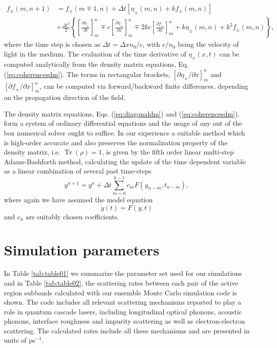 \documentclass[10pt,letterpaper]{article}%
\DeclareMathOperator{\Tr}{Tr}
\begin{document}
\begin{appendices}
\begin{align}
f_{\pm}(m,n+1) &  =f_{\pm}(m\mp1,n)+\Delta t\left[  \eta_{\pm}(m,n)+kf_{\pm
}(m,n)\right]  \nonumber\label{eq:riskennummedal}\\
&  +\frac{\Delta t^{2}}{2}\left\{  \left[  \frac{\partial \eta_{\pm}}{\partial
t}\right]  _{m}^{n}\mp c\left[  \frac{\partial \eta_{\pm}}{\partial x}\right]
_{m}^{n}\mp2kc\left[  \frac{\partial f_{\pm}}{\partial x}\right]  _{m}%
^{n}+k\eta_{\pm}(m,n)+k^{2}f_{\pm}(m,n)\right\}  ,
\end{align}
where the time step is chosen as $\Delta t=\Delta xn_{0}/c$, with $c/n_{0}$
being the velocity of light in the medium. The evaluation of the time
derivative of $\eta_{\pm}(x,t)$ can be computed analytically from the density matrix
equations, Eq. (\ref{eq:coherencesdm}). The terms in rectangular brackets, $\left[
\partial \eta_{\pm}/\partial x\right]  _{m}^{n}$ and $\left[  \partial f_{\pm
}/\partial x\right]  _{m}^{n}$, can be computed via forward/backward
finite differences, depending on the propagation direction of the field. 

The density matrix equations, Eqs. (\ref{eq:diagonaldm}) and
(\ref{eq:coherencesdm}), form a system of ordinary differential equations
and the usage of any out of the box numerical solver ought to suffice. In our
experience a suitable method which is high-order accurate and also preserves
the normalization property of the density matrix, i.e. $\Tr(\rho)=1$, is given
by the fifth order linear multi-step Adams-Bashforth method, calculating the
update of the time dependent variable as a linear combination of several past
time-steps
\begin{equation}
y^{n+1}=y^{n}+\Delta t\sum\limits_{m=0}^{k-1}c_{m}F(y_{n-m},t_{n-m})\text{
},\label{eq:adams-bashforth}%
\end{equation}
where again we have assumed the model equation
\begin{equation}
\dot{y}(t)=F(y,t)\label{eq:adams-bashforth-model}%
\end{equation}
and $c_{n}$ are suitably chosen coefficients.

\section{Simulation parameters}

\label{sec:params} In Table \ref{tab:table01} we summarize the parameter set
used for our simulations and in Table \ref{tab:table02}, the scattering rates
between each pair of the active region subbands calculated with our ensemble
Monte Carlo simulation code \cite{jirauschek2014modeling} is shown. The code
includes all relevant scattering mechanisms reported to play a role in quantum
cascade lasers, including longitudinal optical phonons, acoustic phonons,
interface roughness and impurity scattering as well as electron-electron
scattering. The calculated rates include all these mechanisms and are
presented in units of ps$^{-1}$.


\end{appendices}
\end{document}

